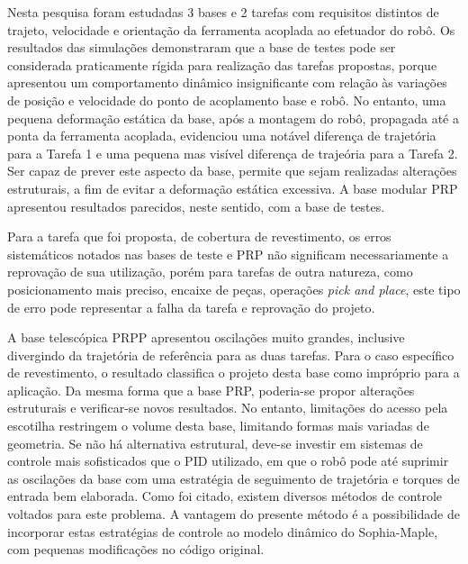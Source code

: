Nesta pesquisa foram estudadas 3 bases e 2 tarefas com requisitos distintos de
trajeto, velocidade e orientação da ferramenta acoplada ao efetuador do robô. Os
resultados das simulações demonstraram que a base de testes pode ser considerada
praticamente rígida para realização das tarefas propostas, porque apresentou um
comportamento dinâmico insignificante com relação às variações de posição e
velocidade do ponto de acoplamento base e robô. No entanto, uma pequena
deformação estática da base, após a montagem do robô, propagada até a ponta da
ferramenta acoplada, evidenciou uma notável diferença de trajetória para a
Tarefa 1 e uma pequena mas visível diferença de trajeória para a Tarefa 2.
Ser capaz de prever este aspecto da base, permite que sejam realizadas
alterações estruturais, a fim de evitar a deformação estática excessiva.
A base modular PRP apresentou resultados parecidos, neste sentido, com a base de
testes.

Para a tarefa que foi proposta, de cobertura de revestimento, os erros
sistemáticos notados nas bases de teste e PRP não significam necessariamente a
reprovação de sua utilização, porém para tarefas de outra natureza, como
posicionamento mais preciso, encaixe de peças, operações \textit{pick and
place}, este tipo de erro pode representar a falha da tarefa e reprovação do
projeto.

A base telescópica PRPP apresentou oscilações muito grandes, inclusive
divergindo da trajetória de referência para as duas tarefas. Para o caso
específico de revestimento, o resultado classifica o projeto desta base como
impróprio para a aplicação. Da mesma forma que a base PRP, poderia-se propor
alterações estruturais e verificar-se novos resultados. No entanto, limitações
do acesso pela escotilha restringem o volume desta base, limitando formas mais
variadas de geometria. Se não há alternativa estrutural, deve-se investir em
sistemas de controle mais sofisticados que o PID utilizado, em que o robô pode
até suprimir as oscilações da base com uma estratégia de seguimento de
trajetória e torques de entrada bem elaborada. Como foi citado, existem diversos
métodos de controle voltados para este problema. A vantagem do presente método é
a possibilidade de incorporar estas estratégias de controle ao modelo dinâmico
do Sophia-Maple, com pequenas modificações no código original.






